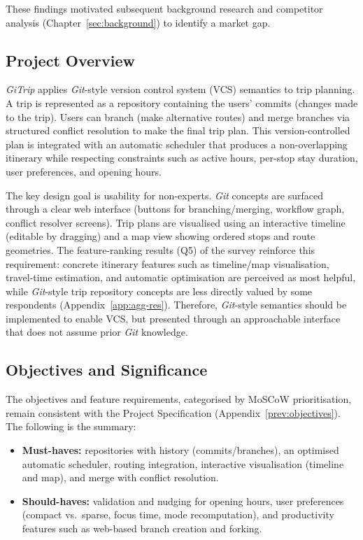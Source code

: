 These findings motivated subsequent background research and competitor analysis (Chapter~\ref{sec:background}) to identify a market gap.

\subsection{Project Overview}
\textit{GiTrip} applies \textit{Git}-style version control system (VCS) semantics to trip planning. A trip is represented as a repository containing the users’ commits (changes made to the trip). Users can branch (make alternative routes) and merge branches via structured conflict resolution to make the final trip plan. This version-controlled plan is integrated with an automatic scheduler that produces a non-overlapping itinerary while respecting constraints such as active hours, per-stop stay duration, user preferences, and opening hours.

The key design goal is usability for non-experts. \textit{Git} concepts are surfaced through a clear web interface (buttons for branching/merging, workflow graph, conflict resolver screens). Trip plans are visualised using an interactive timeline (editable by dragging) and a map view showing ordered stops and route geometries. The feature-ranking results (Q5) of the survey reinforce this requirement: concrete itinerary features such as timeline/map visualisation, travel-time estimation, and automatic optimisation are perceived as most helpful, while \textit{Git}-style trip repository concepts are less directly valued by some respondents (Appendix~\ref{app:agg-res}). Therefore, \textit{Git}-style semantics should be implemented to enable VCS, but presented through an approachable interface that does not assume prior \textit{Git} knowledge.

\subsection{Objectives and Significance}
The objectives and feature requirements, categorised by MoSCoW prioritisation, remain consistent with the Project Specification (Appendix~\ref{prev:objectives}). The following is the summary:

\begin{itemize}
    \item \textbf{Must-haves:} repositories with history (commits/branches), an optimised automatic scheduler, routing integration, interactive visualisation (timeline and map), and merge with conflict resolution.
    \item \textbf{Should-haves:} validation and nudging for opening hours, user preferences (compact vs.\ sparse, focus time, mode recomputation), and productivity features such as web-based branch creation and forking.
\end{itemize}

